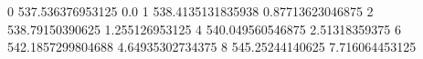 0 537.536376953125 0.0
1 538.4135131835938 0.87713623046875
2 538.79150390625 1.255126953125
4 540.049560546875 2.51318359375
6 542.1857299804688 4.64935302734375
8 545.25244140625 7.716064453125
